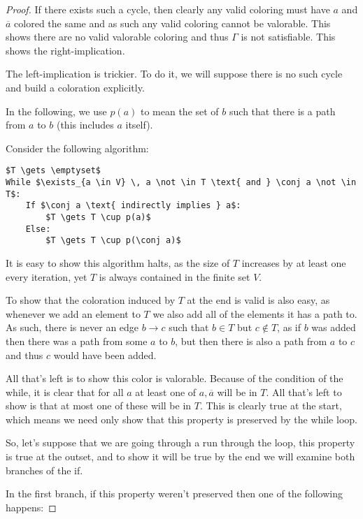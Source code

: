 \documentclass[11pt]{article}
\newcommand{\conj}[1]{\overline{#1}}
\begin{document}
\begin{proof}
If there exists such a cycle, then clearly any valid coloring must have $a$ and $\conj a$ colored the same and as such any valid coloring cannot be valorable. This shows there are no valid valorable coloring and thus $\Gamma$ is not satisfiable. This shows the right-implication.

The left-implication is trickier. To do it, we will suppose there is no such cycle and build a coloration explicitly.

In the following, we use $p(a)$ to mean the set of $b$ such that there is a path from $a$ to $b$ (this includes $a$ itself).

Consider the following algorithm:

\begin{lstlisting}[mathescape]
$T \gets \emptyset$
While $\exists_{a \in V} \, a \not \in T \text{ and } \conj a \not \in T$:
    If $\conj a \text{ indirectly implies } a$:
        $T \gets T \cup p(a)$
    Else:
        $T \gets T \cup p(\conj a)$
\end{lstlisting}

It is easy to show this algorithm halts, as the size of $T$ increases by at least one every iteration, yet $T$ is always contained in the finite set $V$.

To show that the coloration induced by $T$ at the end is valid is also easy, as whenever we add an element to $T$ we also add all of the elements it has a path to. As such, there is never an edge $b \rightarrow c$ such that $b \in T$ but $c \not \in T$, as if $b$ was added then there was a path from some $a$ to $b$, but then there is also a path from $a$ to $c$ and thus $c$ would have been added.


All that's left is to show this color is valorable. Because of the condition of the while, it is clear that for all $a$ at least one of $a, \conj a$ will be in $T$. All that's left to show is that at most one of these will be in $T$. This is clearly true at the start, which means we need only show that this property is preserved by the while loop.

So, let's suppose that we are going through a run through the loop, this property is true at the outset, and to show it will be true by the end we will examine both branches of the if.

In the first branch, if this property weren't preserved then one of the following happens:


\end{proof}
\end{document}
